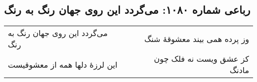 \begin{center}
\section*{رباعی شماره ۱۰۸۰: می‌گردد این روی جهان رنگ به رنگ}
\label{sec:1080}
\begin{longtable}{l p{0.5cm} r}
می‌گردد این روی جهان رنگ به رنگ
&&
وز پرده همی بیند معشوقهٔ شنگ
\\
این لرزهٔ دلها همه از معشوقیست
&&
کز عشق ویست نه فلک چون مادنگ
\\
\end{longtable}
\end{center}
